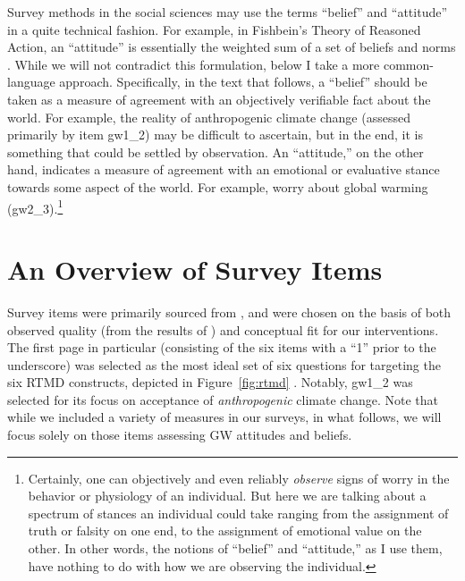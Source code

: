 Survey methods in the social sciences may use the terms “belief” and “attitude”
in a quite technical fashion. For example, in Fishbein's Theory of Reasoned
Action, an “attitude” is essentially the weighted sum of a set of beliefs and
norms \parencite[see][for an overview of such theories]{montano_theory_2008}.
While we will not contradict this formulation, below I take a more
common-language approach. Specifically, in the text that follows, a “belief”
should be taken as a measure of agreement with an objectively verifiable fact
about the world. For example, the reality of anthropogenic climate change
(assessed primarily by item \textsf{gw1_2}) may be difficult to ascertain, but
in the end, it is something that could be settled by observation.  An
“attitude,” on the other hand, indicates a measure of agreement with an
emotional or evaluative stance towards some aspect of the world.  For example,
worry about global warming (\textsf{gw2_3}).\footnote{Certainly, one can
    objectively and even reliably \emph{observe} signs of worry in the behavior
    or physiology of an individual. But here we are talking about a spectrum of
    stances an individual could take ranging from the assignment of truth or
    falsity on one end, to the assignment of emotional value on the other. In
    other words, the notions of “belief” and “attitude,” as I use them, have
    nothing to do with how we are observing the individual.}
    
\section{An Overview of Survey Items}

Survey items were primarily sourced from \textcite{martinez_factors_2009}, and
were chosen on the basis of both observed quality (from the results of
\cite{martinez_factors_2009}) and conceptual fit for our interventions. The
first page in particular (consisting of the six items with a “1” prior to the
underscore) was selected as the most ideal set of six questions for targeting the
six RTMD constructs, depicted in Figure~\ref{fig:rtmd}
\parencite{ranney_why_2012}.  Notably, \textsf{gw1_2} was selected for its focus
on acceptance of \emph{anthropogenic} climate change. Note that while we
included a variety of measures in our surveys, in what follows, we will focus
solely on those items assessing GW attitudes and beliefs.


